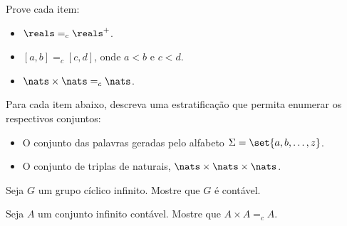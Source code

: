 \begin{exercise}
Prove cada item:
	\begin{itemize}
		\item $\reals =_c \reals^+$.
		\item $[a, b] =_c [c, d]$, onde $a < b$ e $c < d$.
		\item $\nats \times \nats =_c \nats$.
	\end{itemize}
\end{exercise}

\begin{exercise}
Para cada item abaixo, descreva uma estratificação que permita enumerar os respectivos conjuntos:
	\begin{itemize}
		\item O conjunto das palavras geradas pelo alfabeto $\Sigma = \set{a, b, \dots, z}$.
		\item O conjunto de triplas de naturais, $\nats \times \nats \times \nats$.
	\end{itemize}
\end{exercise}

\begin{exercise}
Seja $G$ um grupo cíclico infinito. Mostre que $G$ é contável.
\end{exercise}

\begin{exercise}
Seja $A$ um conjunto infinito contável. Mostre que $A \times A =_c A$. 
\end{exercise}
